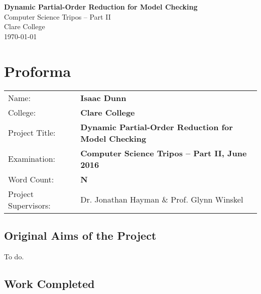 \documentclass[12pt,a4paper,twoside,openright]{report}
\begin{document}





\pagestyle{empty}


\vspace*{60mm}
\begin{center}
\Huge
\textbf{Dynamic Partial-Order Reduction for Model Checking} \\[5mm]
Computer Science Tripos -- Part II \\[5mm]
Clare College \\[5mm]
\today  %
\end{center}


\pagestyle{plain}

\chapter*{Proforma}

{\large
\begin{tabular}{ll}
Name:               & \bf Isaac Dunn                            			 \\
College:            & \bf Clare College                    				     \\
Project Title:      & \bf Dynamic Partial-Order Reduction for Model Checking \\
Examination:        & \bf Computer Science Tripos -- Part II, June 2016      \\
Word Count:         & \bf N    \\
Project Supervisors:& Dr. Jonathan Hayman \& Prof. Glynn Winskel             \\ 
\end{tabular}
}


\section*{Original Aims of the Project}

To do.

\section*{Work Completed}
\end{document}
